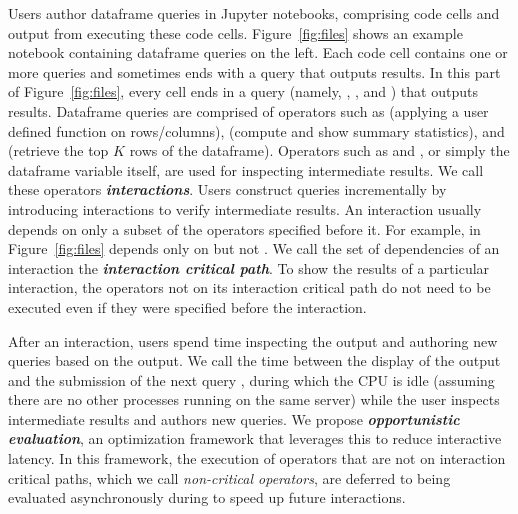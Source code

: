 Users author dataframe queries in Jupyter notebooks,  comprising code cells and output from executing these code cells. Figure~\ref{fig:files} shows an example notebook containing dataframe queries on the left. Each code cell contains one or more queries and sometimes ends with a query that outputs results. In this part of Figure~\ref{fig:files}, every cell ends in a query (namely, , , and ) that outputs results.
Dataframe queries are comprised of operators such as  (applying a user defined function on rows/columns),  (compute and show summary statistics), and  (retrieve the top $K$ rows of the dataframe). Operators such as  and , or simply the dataframe variable itself, are used for inspecting intermediate results. We call these operators \textbf{\textit{interactions}}. 
Users construct queries incrementally by introducing interactions to verify intermediate results. An interaction usually depends on only a subset of the operators specified before it. 
For example,  in Figure~\ref{fig:files} depends only on 
but not
.
We call the set of dependencies of an interaction the \textbf{\textit{interaction critical path}}. To show the results of a particular interaction, the operators not on its interaction critical path do not need to be executed even if they were specified before the interaction.

After an interaction, users spend time inspecting the output and authoring new queries based on the output. We call the time between the display of the output and the submission of the next query \textbf{\textit{\thinktime}}, during which the CPU is idle (assuming there are no other processes running on the same server) while the user inspects intermediate results and authors new queries.
We propose \textbf{\textit{opportunistic evaluation}}, an optimization framework that leverages this \thinktime to reduce interactive latency. 
In this framework, the execution of operators that are not on interaction critical paths, which we call \textit{non-critical operators}, are deferred to being evaluated asynchronously during \thinktime to speed up future interactions.
